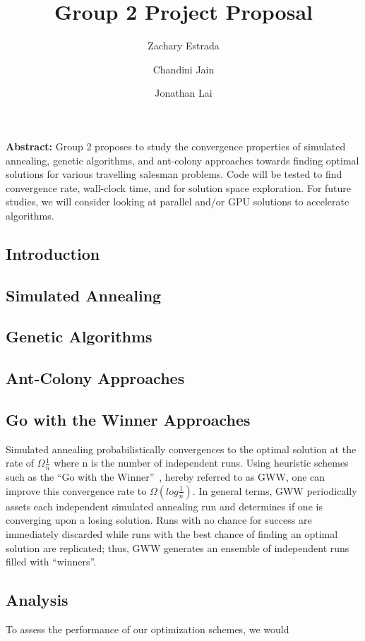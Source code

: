 \documentclass[12pt,onecolumn,notitlepage]{article}
\title{Group 2 Project Proposal}
\author{Zachary Estrada \and Chandini Jain \and Jonathan Lai}
\begin{document}
\maketitle


\textbf{Abstract:} Group 2 proposes to study the convergence
properties of simulated annealing, genetic algorithms, and ant-colony approaches towards
finding optimal solutions for various travelling salesman problems.  Code will be tested
to find convergence rate, wall-clock time, and for solution space exploration.  For future studies,
we will consider looking at parallel and/or GPU solutions to accelerate algorithms.

\subsection{Introduction}

\subsection{Simulated Annealing}

\subsection{Genetic Algorithms}

\subsection{Ant-Colony Approaches}

\subsection{Go with the Winner Approaches}
Simulated annealing probabilistically convergences to the optimal solution at the rate
 of $\Omega{\frac{1}{n}}$ where n is the number of independent runs.  
Using heuristic schemes such as the ``Go with the Winner''~\cite{Aldous1994gwt}, hereby referred to as GWW, 
one can improve this convergence rate to $\Omega(log \frac{1}{n})$.  In general terms, GWW periodically assets
each independent simulated annealing run and determines if one is converging upon a losing solution.  Runs with 
no chance for success are immediately discarded while runs with the best chance of finding an optimal solution
are replicated; thus, GWW generates an ensemble of independent runs filled with  ``winners''.  

\subsection{Analysis}
To assess the performance of our optimization schemes, we would




\end{document}
